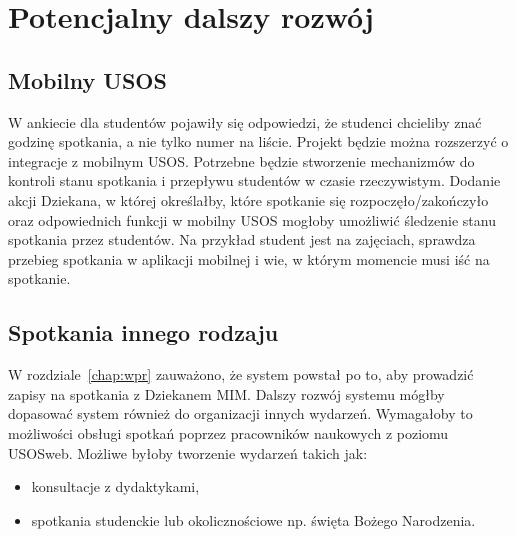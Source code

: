 \documentclass[licencjacka]{pracamgr}
\begin{document}


\chapter{Potencjalny dalszy rozwój}  \label{chap:rozwoj}

\section{Mobilny USOS}

W ankiecie dla studentów pojawiły się odpowiedzi, że studenci chcieliby znać godzinę spotkania, a nie tylko numer na liście. Projekt będzie można rozszerzyć o integracje z mobilnym USOS. Potrzebne będzie stworzenie mechanizmów do kontroli stanu spotkania i przepływu studentów w czasie rzeczywistym. Dodanie akcji Dziekana, w której określałby, które spotkanie się rozpoczęło/zakończyło oraz odpowiednich funkcji w mobilny USOS mogłoby umożliwić śledzenie stanu spotkania przez studentów. Na przykład student jest na zajęciach, sprawdza przebieg spotkania w aplikacji mobilnej i wie, w którym momencie musi iść na spotkanie.

\section{Spotkania innego rodzaju}
W rozdziale~\ref{chap:wpr} zauważono, że system powstał po to, aby prowadzić zapisy na spotkania z Dziekanem MIM. Dalszy rozwój systemu mógłby dopasować system również do organizacji innych wydarzeń. Wymagałoby to możliwości obsługi spotkań poprzez pracowników naukowych z poziomu USOSweb. Możliwe byłoby tworzenie wydarzeń takich jak:
\begin{itemize}
	\item konsultacje z dydaktykami,
	\item spotkania studenckie lub okolicznościowe np. święta Bożego Narodzenia.
\end{itemize}

\end{document}
